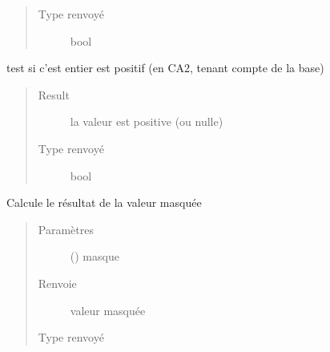 \documentclass[letterpaper,10pt,french]{sphinxmanual}
\begin{document}
\begin{fulllineitems}
\begin{fulllineitems}
\begin{quote}
\begin{description}
\item[{Type renvoyé}] \leavevmode
bool

\end{description}\end{quote}

\end{fulllineitems}


\begin{fulllineitems}
\label{\detokenize{executeurcomponents:executeurcomponents.DataValue.isPos}}
test si c’est entier est positif (en CA2, tenant compte de la base)
\begin{quote}\begin{description}
\item[{Result}] \leavevmode
la valeur est positive (ou nulle)

\item[{Type renvoyé}] \leavevmode
bool

\end{description}\end{quote}

\end{fulllineitems}


\begin{fulllineitems}
\label{\detokenize{executeurcomponents:executeurcomponents.DataValue.mask}}
Calcule le résultat de la valeur masquée
\begin{quote}\begin{description}
\item[{Paramètres}] \leavevmode
{} () \textendash{} masque

\item[{Renvoie}] \leavevmode
valeur masquée

\item[{Type renvoyé}] \leavevmode
{\hyperref[\detokenize{executeurcomponents:executeurcomponents.DataValue}]{}}


\end{description}
\end{quote}
\end{fulllineitems}
\end{fulllineitems}
\end{document}
